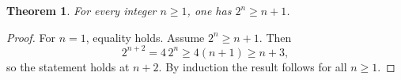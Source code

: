 \documentclass{article}
\newtheorem{theorem}{Theorem}
\begin{document}
\begin{theorem}\label{thm:stride-induction}
For every integer $n\ge 1$, one has $2^n\ge n+1$.
\end{theorem}
\begin{proof}
For $n=1$, equality holds. Assume $2^n\ge n+1$. Then
\[
  2^{n+2}=4\,2^n\ge 4(n+1)\ge n+3,
\]
so the statement holds at $n+2$. By induction the result follows for all
$n\ge1$.
\end{proof}
\end{document}
